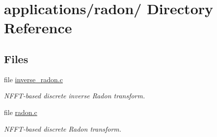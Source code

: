 \hypertarget{dir_000022}{
\section{applications/radon/ Directory Reference}
\label{dir_000022}
}
\subsection*{Files}
\begin{CompactItemize}
\item 
file \hyperlink{inverse__radon_8c}{inverse\_\-radon.c}
\begin{CompactList}\small\item\em NFFT-based discrete inverse Radon transform. \item\end{CompactList}

\item 
file \hyperlink{radon_8c}{radon.c}
\begin{CompactList}\small\item\em NFFT-based discrete Radon transform. \item\end{CompactList}

\end{CompactItemize}
